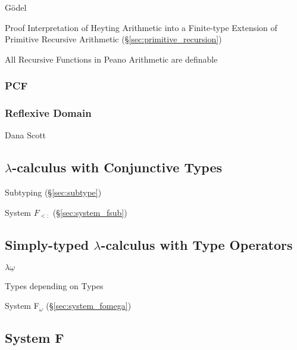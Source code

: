 G\"odel

Proof Interpretation of Heyting Arithmetic into a Finite-type
Extension of Primitive Recursive Arithmetic
(\S\ref{sec:primitive_recursion})

All Recursive Functions in Peano Arithmetic are definable



\subsubsection{PCF}\label{sec:pcf}



\subsubsection{Reflexive Domain}\label{sec:reflexive_domain}

Dana Scott %



\subsection{$\lambda$-calculus with Conjunctive Types}
\label{sec:conjunctive_lambda}

Subtyping (\S\ref{sec:subtype})

System $F_{<:}$ (\S\ref{sec:system_fsub})



\subsection{Simply-typed $\lambda$-calculus with Type Operators}
\label{sec:simply_operators}

$\lambda\underline{\omega}$

Types depending on Types

System F$_\omega$ (\S\ref{sec:system_fomega})



\subsection{System F}\label{sec:system_f}

